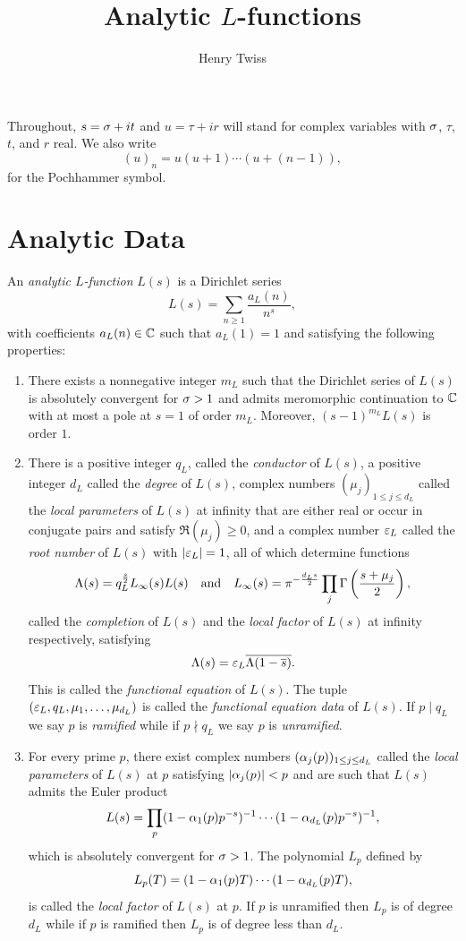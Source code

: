 \documentclass[12pt]{article}
\title{Analytic \(L\)-functions}
\author{Henry Twiss}
\begin{document}
  \date{}
  \maketitle
  Throughout, \(s = \sigma+it\) and \(u = \tau+ir\) will stand for complex variables with \(\sigma\), \(\tau\), \(t\), and \(r\) real. We also write
  \[
    (u)_{n} = u(u+1) \cdots (u+(n-1)),
  \]
  for the Pochhammer symbol.
  \section{Analytic Data}
    An \textit{analytic \(L\)-function} \(L(s)\) is a Dirichlet series
    \[
      L(s) = \sum_{n \ge 1}\frac{a_{L}(n)}{n^{s}},
    \]
    with coefficients \(a_{L}(n) \in \mathbb{C}\) such that \(a_{L}(1) = 1\) and satisfying the following properties:
    \begin{enumerate}[align=left]
      \item[\textbf{Analyticity:}] There exists a nonnegative integer \(m_{L}\) such that the Dirichlet series of \(L(s)\) is absolutely convergent for \(\sigma > 1\) and admits meromorphic continuation to \(\mathbb{C}\) with at most a pole at \(s = 1\) of order \(m_{L}\). Moreover, \((s-1)^{m_{L}}L(s)\) is order \(1\).
      \item[\textbf{Functional Equation:}] There is a positive integer \(q_{L}\), called the \textit{conductor} of \(L(s)\), a positive integer \(d_{L}\) called the \textit{degree} of \(L(s)\), complex numbers \((\mu_{j})_{1 \le j \le d_{L}}\) called the \textit{local parameters} of \(L(s)\) at infinity that are either real or occur in conjugate pairs and satisfy \(\Re(\mu_{j}) \ge 0\), and a complex number \(\varepsilon_{L}\) called the \textit{root number} of \(L(s)\) with \(|\varepsilon_{L}| = 1\), all of which determine functions
      \[
        \Lambda(s) = q_{L}^{\frac{s}{2}}L_{\infty}(s)L(s) \quad \text{and} \quad L_{\infty}(s) = \pi^{-\frac{d_{L}s}{2}}\prod_{j}\Gamma\left(\frac{s+\mu_{j}}{2}\right),
      \]
      called the \textit{completion} of \(L(s)\) and the \textit{local factor} of \(L(s)\) at infinity respectively, satisfying
      \[
        \Lambda(s) = \varepsilon_{L}\overline{\Lambda(1-\overline{s})}.
      \]
      This is called the \textit{functional equation} of \(L(s)\). The tuple \((\varepsilon_{L},q_{L},\mu_{1},\ldots,\mu_{d_{L}})\) is called the \textit{functional equation data} of \(L(s)\). If \(p \mid q_{L}\) we say \(p\) is \textit{ramified} while if \(p \nmid q_{L}\) we say \(p\) is \textit{unramified}.
      \item[\textbf{Euler product:}] For every prime \(p\), there exist complex numbers \((\alpha_{j}(p))_{1 \le j \le d_{L}}\) called the \textit{local parameters} of \(L(s)\) at \(p\) satisfying \(|\alpha_{j}(p)| < p\) and are such that \(L(s)\) admits the Euler product
      \[
        L(s) = \prod_{p}(1-\alpha_{1}(p)p^{-s})^{-1} \cdots (1-\alpha_{d_{L}}(p)p^{-s})^{-1},
      \]
      which is absolutely convergent for \(\sigma > 1\). The polynomial \(L_{p}\) defined by
      \[
        L_{p}(T) = (1-\alpha_{1}(p)T) \cdots (1-\alpha_{d_{L}}(p)T),
      \]
      is called the \textit{local factor} of \(L(s)\) at \(p\). If \(p\) is unramified then \(L_{p}\) is of degree \(d_{L}\) while if \(p\) is ramified then \(L_{p}\) is of degree less than \(d_{L}\).
    \end{enumerate}
\end{document}
